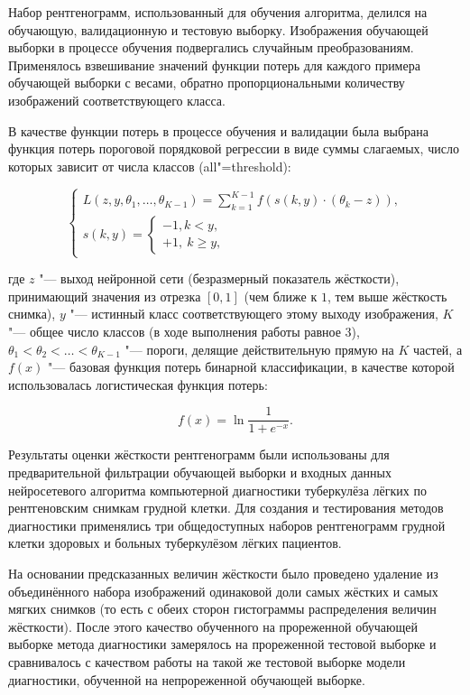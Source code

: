 Набор рентгенограмм, использованный для обучения алгоритма, делился на обучающую, валидационную и тестовую выборку. Изображения обучающей выборки в процессе обучения подвергались случайным преобразованиям. Применялось взвешивание значений функции потерь для каждого примера обучающей выборки с весами, обратно пропорциональными количеству изображений соответствующего класса.

В качестве функции потерь в процессе обучения и валидации была выбрана функция потерь пороговой порядковой регрессии в виде суммы слагаемых, число которых зависит от числа классов (all"=threshold):

\begin{equation}
	\begin{cases}
		L \left( z, y, \theta_1, \ldots, \theta_{K-1} \right) = \sum_{k=1}^{K-1} f \left( s \left( k, y \right) \cdot \left( \theta_k-z \right) \right), \\
		s \left( k, y \right) =
		\begin{cases}
			-1, k < y, \\
			+1, \ k \geq y,
		\end{cases}
	\end{cases} \nonumber
\end{equation}

\noindent где $z$ "--- выход нейронной сети (безразмерный показатель жёсткости), принимающий значения из отрезка $\left[ 0, 1 \right]$ (чем ближе к $1$, тем выше жёсткость снимка), $y$ "--- истинный класс соответствующего этому выходу изображения, $K$ "--- общее число классов (в ходе выполнения работы равное 3), $\theta_1 < \theta_2 < \ldots < \theta_{K-1}$ "--- пороги, делящие действительную прямую на $K$ частей, а $f(x)$ "--- базовая функция потерь бинарной классификации, в качестве которой использовалась логистическая функция потерь:

\begin{equation}
	f \left( x \right) = \ln{\frac{1}{1+e^{-x}}}. \nonumber
\end{equation}

Результаты оценки жёсткости рентгенограмм были использованы для предварительной фильтрации обучающей выборки и входных данных нейросетевого алгоритма компьютерной диагностики туберкулёза лёгких по рентгеновским снимкам грудной клетки. Для создания и тестирования методов диагностики применялись три общедоступных наборов рентгенограмм грудной клетки здоровых и больных туберкулёзом лёгких пациентов.

На основании предсказанных величин жёсткости было проведено удаление из объединённого набора изображений одинаковой доли самых жёстких и самых мягких снимков (то есть с обеих сторон гистограммы распределения величин жёсткости). После этого качество обученного на прореженной обучающей выборке метода диагностики замерялось на прореженной тестовой выборке и сравнивалось с качеством работы на такой же тестовой выборке модели диагностики, обученной на непрореженной обучающей выборке.

